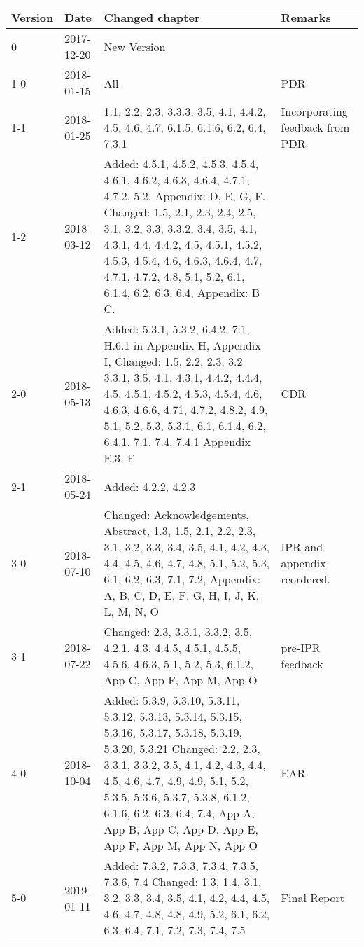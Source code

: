 \begin{longtable}{|p{1.5cm}|p{2cm}|p{6cm}|p{3cm}|}\hline
\centering
\textbf{Version} & \textbf{Date}       & \textbf{Changed chapter}   & \textbf{Remarks}  \\\hline
0       & 2017-12-20 & New Version   &          \\
1-0     & 2018-01-15 & All          & PDR                             \\
1-1     & 2018-01-25 & 1.1, 2.2, 2.3, 3.3.3, 3.5, 4.1, 4.4.2, 4.5, 4.6, 4.7, 6.1.5, 6.1.6, 6.2, 6.4, 7.3.1                                                                                                                                                                                        & Incorporating feedback from PDR \\
1-2     & 2018-03-12 &  Added: 4.5.1, 4.5.2, 4.5.3, 4.5.4, 4.6.1, 4.6.2, 4.6.3, 4.6.4, 4.7.1, 4.7.2, 5.2, Appendix: D, E, G, F.  Changed: 1.5, 2.1, 2.3, 2.4, 2.5, 3.1, 3.2, 3.3, 3.3.2, 3.4, 3.5, 4.1, 4.3.1, 4.4, 4.4.2, 4.5, 4.5.1, 4.5.2, 4.5.3, 4.5.4, 4.6, 4.6.3, 4.6.4, 4.7, 4.7.1, 4.7.2, 4.8, 5.1, 5.2, 6.1, 6.1.4, 6.2, 6.3, 6.4, Appendix: B C.                                                     &                                 \\
2-0     & 2018-05-13 & Added: 5.3.1, 5.3.2, 6.4.2, 7.1, H.6.1 in Appendix H, Appendix I, Changed: 1.5, 2.2, 2.3, 3.2 3.3.1, 3.5, 4.1, 4.3.1, 4.4.2, 4.4.4, 4.5, 4.5.1, 4.5.2, 4.5.3, 4.5.4, 4.6, 4.6.3, 4.6.6, 4.71, 4.7.2, 4.8.2, 4.9, 5.1, 5.2, 5.3, 5.3.1, 6.1, 6.1.4, 6.2, 6.4.1, 7.1, 7.4, 7.4.1 Appendix E.3, F & CDR   \\
2-1     & 2018-05-24 & Added: 4.2.2, 4.2.3 & \\
3-0     & 2018-07-10  & Changed: Acknowledgements, Abstract, 1.3, 1.5, 2.1, 2.2, 2.3, 3.1, 3.2, 3.3, 3.4, 3.5, 4.1, 4.2, 4.3, 4.4, 4.5, 4.6, 4.7, 4.8, 5.1, 5.2, 5.3, 6.1, 6.2, 6.3, 7.1, 7.2, Appendix: A, B, C, D, E, F, G, H, I, J, K, L, M, N, O & IPR and appendix reordered. \\ 
3-1     & 2018-07-22  & Changed: 2.3, 3.3.1, 3.3.2, 3.5, 4.2.1, 4.3, 4.4.5, 4.5.1, 4.5.5, 4.5.6, 4.6.3, 5.1, 5.2, 5.3, 6.1.2, App C, App F, App M, App O   & pre-IPR feedback\\ \hline 
4-0 & 2018-10-04 & Added: 5.3.9, 5.3.10, 5.3.11, 5.3.12, 5.3.13, 5.3.14, 5.3.15, 5.3.16, 5.3.17, 5.3.18, 5.3.19, 5.3.20, 5.3.21 Changed: 2.2, 2.3, 3.3.1, 3.3.2, 3.5, 4.1, 4.2, 4.3, 4.4, 4.5, 4.6, 4.7, 4.9, 4.9, 5.1, 5.2, 5.3.5, 5.3.6, 5.3.7, 5.3.8, 6.1.2, 6.1.6, 6.2, 6.3, 6.4, 7.4, App A, App B, App C, App D, App E, App F, App M, App N, App O  & EAR \\ \hline
5-0 & 2019-01-11 & Added: 7.3.2, 7.3.3, 7.3.4, 7.3.5, 7.3.6, 7.4 Changed: 1.3, 1.4, 3.1, 3.2, 3.3, 3.4, 3.5, 4.1, 4.2, 4.4, 4.5, 4.6, 4.7, 4.8, 4.8, 4.9, 5.2, 6.1, 6.2, 6.3, 6.4, 7.1, 7.2, 7.3, 7.4, 7.5  & Final Report \\ \hline
\end{longtable}           